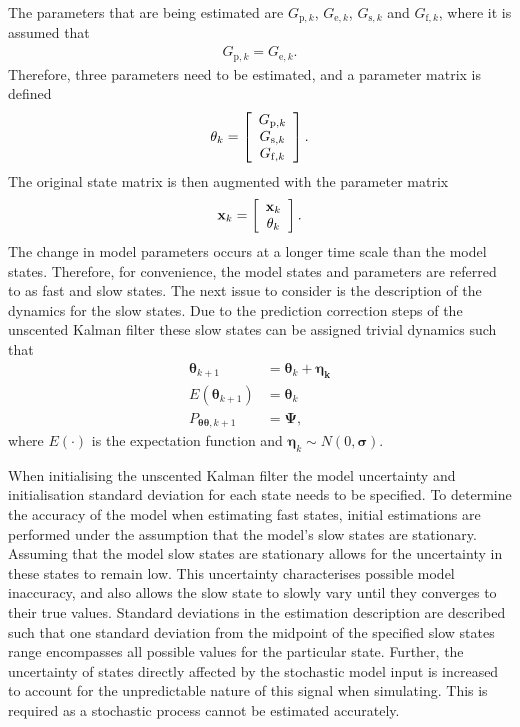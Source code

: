 The parameters that are being estimated are $G_{\mathrm{p},k}$, $G_{\mathrm{e},k}$, $G_{\mathrm{s},k}$ and $G_{\mathrm{f},k}$, where it is assumed that \begin{align}
G_{\mathrm{p},k} = G_{\mathrm{e},k}.
\end{align} Therefore, three parameters need to be estimated, and a parameter matrix is defined
\[ \mathbf{\theta}_{k} = \left[ \begin{array}[pos]{c}
G_{\mathrm{p},k}\\
G_{\mathrm{s},k} \\
G_{\mathrm{f},k} \end{array} \right] .\] The original state matrix is then augmented with the parameter matrix 
\[ \mathbf{x}_{k} = \left[ \begin{array}[pos]{c}
\mathbf{x}_{k}\\
\mathbf{\theta}_{k} \end{array} \right] .\] The change in model parameters occurs at a longer time scale than the model states. Therefore, for convenience, the model states and parameters are referred to as fast and slow states. The next issue to consider is the description of the dynamics for the slow states. Due to the prediction correction steps of the unscented Kalman filter these slow states can be assigned trivial dynamics such that
\begin{align}
\label{eqn: parameterdynamics}
\mathbf{\theta}_{k+1} &= \mathbf{\theta}_{k} + \mathbf{\eta_{k}}\\
E(\mathbf{\theta}_{k+1}) &= \mathbf{\theta}_{k}\\
P_{\mathbf{\theta} \mathbf{\theta},k+1} &= \mathbf{\Psi},
\end{align} where $E(\cdot)$ is the expectation function and $\mathbf{\eta}_{k} \sim N(0,\mathbf{\sigma})$.

When initialising the unscented Kalman filter the model uncertainty and initialisation standard deviation for each state needs to be specified. To determine the accuracy of the model when estimating fast states, initial estimations are performed under the assumption that the model's slow states are stationary. Assuming that the model slow states are stationary allows for the uncertainty in these states to remain low. This uncertainty characterises possible model inaccuracy, and also allows the slow state to slowly vary until they converges to their true values. Standard deviations in the estimation description are described such that one standard deviation from the midpoint of the specified slow states range encompasses all possible values for the particular state. Further, the uncertainty of states directly affected by the stochastic model input is increased to account for the unpredictable nature of this signal when simulating. This is required as a stochastic process cannot be estimated accurately. 

